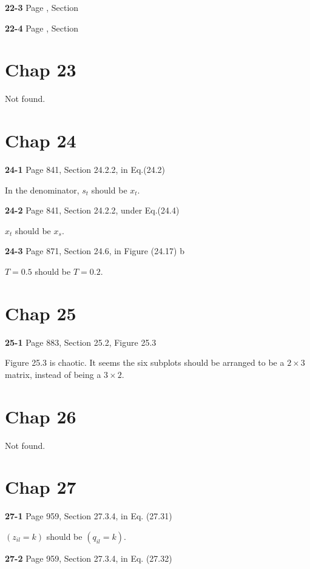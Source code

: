 \documentclass[aps,preprint,a4]{revtex4-1}
\begin{document}
{\color{red}\textbf{22-3}} Page , Section 

{\color{red}\textbf{22-4}} Page , Section 


\section{Chap 23}
Not found.




\section{Chap 24}
{\color{red}\textbf{24-1}} Page 841, Section 24.2.2, in Eq.(24.2)

In the denominator, $s_{t}$ should be $x_{t}$.

{\color{red}\textbf{24-2}} Page 841, Section 24.2.2, under Eq.(24.4)

$x_{t}$ should be $x_{s}$.

{\color{red}\textbf{24-3}} Page 871, Section 24.6, in Figure (24.17) b

$T = 0.5$ should be $T = 0.2$.


\section{Chap 25}
{\color{red}\textbf{25-1}} Page 883, Section 25.2, Figure 25.3

Figure 25.3 is chaotic. It seems the six subplots should be arranged to be a $2 \times 3$ matrix, instead of
being a $3 \times 2$.


\section{Chap 26}
Not found.




\section{Chap 27}
{\color{red}\textbf{27-1}} Page 959, Section 27.3.4, in Eq. (27.31)

$(z_{il}=k)$ should be $(q_{il}=k)$.

{\color{red}\textbf{27-2}} Page 959, Section 27.3.4, in Eq. (27.32) 
\end{document}
